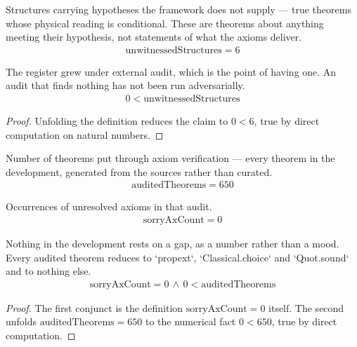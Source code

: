 \begin{definition}
Structures carrying hypotheses the framework does not supply — true theorems whose physical reading is conditional.  These are theorems about anything meeting their hypothesis, not statements of what the axioms deliver.
\begin{align*}
\text{unwitnessedStructures} = 6
\end{align*}
\end{definition}

\begin{theorem}
The register grew under external audit, which is the point of having one.  An audit that finds nothing has not been run adversarially.
\begin{align*}
0 < \text{unwitnessedStructures}
\end{align*}
\begin{proof}
Unfolding the definition reduces the claim to $0<6$, true by direct computation on natural numbers.
\end{proof}
\end{theorem}

\begin{definition}
Number of theorems put through axiom verification — every theorem in the development, generated from the sources rather than curated.
\begin{align*}
\text{auditedTheorems} = 650
\end{align*}
\end{definition}

\begin{definition}
Occurrences of unresolved axioms in that audit.
\begin{align*}
\text{sorryAxCount} = 0
\end{align*}
\end{definition}

\begin{theorem}
Nothing in the development rests on a gap, as a number rather than a mood.  Every audited theorem reduces to `propext`, `Classical.choice` and `Quot.sound` and to nothing else.
\begin{align*}
\text{sorryAxCount} = 0 \,\wedge\, 0 < \text{auditedTheorems}
\end{align*}
\begin{proof}
The first conjunct is the definition $\text{sorryAxCount}=0$ itself. The second unfolds $\text{auditedTheorems}=650$ to the numerical fact $0<650$, true by direct computation.
\end{proof}
\end{theorem}

